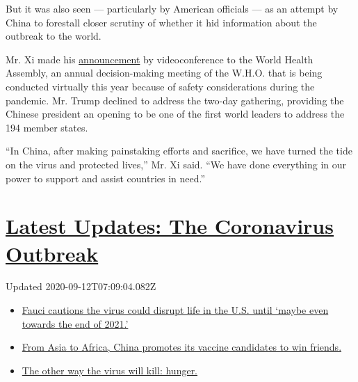 But it was also seen --- particularly by American officials --- as an
attempt by China to forestall closer scrutiny of whether it hid
information about the outbreak to the world.

Mr. Xi made his
\href{https://www.globaltimes.cn/content/1188716.shtml}{announcement} by
videoconference to the World Health Assembly, an annual decision-making
meeting of the W.H.O. that is being conducted virtually this year
because of safety considerations during the pandemic. Mr. Trump declined
to address the two-day gathering, providing the Chinese president an
opening to be one of the first world leaders to address the 194 member
states.

``In China, after making painstaking efforts and sacrifice, we have
turned the tide on the virus and protected lives,'' Mr. Xi said. ``We
have done everything in our power to support and assist countries in
need.''

\hypertarget{latest-updates-the-coronavirus-outbreak}{%
\section{\texorpdfstring{\href{https://www.nytimes3xbfgragh.onion/2020/09/11/world/covid-19-coronavirus.html?action=click\&pgtype=Article\&state=default\&region=MAIN_CONTENT_1\&context=storylines_live_updates}{Latest
Updates: The Coronavirus
Outbreak}}{Latest Updates: The Coronavirus Outbreak}}\label{latest-updates-the-coronavirus-outbreak}}

Updated 2020-09-12T07:09:04.082Z

\begin{itemize}
\tightlist
\item
  \href{https://www.nytimes3xbfgragh.onion/2020/09/11/world/covid-19-coronavirus.html?action=click\&pgtype=Article\&state=default\&region=MAIN_CONTENT_1\&context=storylines_live_updates\#link-dfb8a16}{Fauci
  cautions the virus could disrupt life in the U.S. until `maybe even
  towards the end of 2021.'}
\item
  \href{https://www.nytimes3xbfgragh.onion/2020/09/11/world/covid-19-coronavirus.html?action=click\&pgtype=Article\&state=default\&region=MAIN_CONTENT_1\&context=storylines_live_updates\#link-7104d154}{From
  Asia to Africa, China promotes its vaccine candidates to win friends.}
\item
  \href{https://www.nytimes3xbfgragh.onion/2020/09/11/world/covid-19-coronavirus.html?action=click\&pgtype=Article\&state=default\&region=MAIN_CONTENT_1\&context=storylines_live_updates\#link-393ad215}{The
  other way the virus will kill: hunger.}
\end{itemize}

